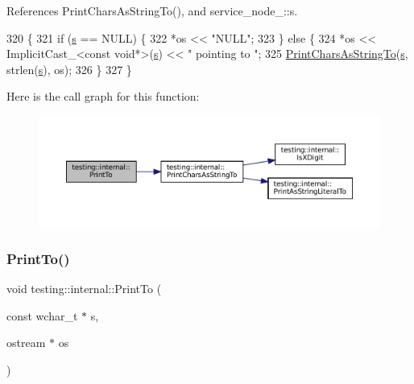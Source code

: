 References Print\+Chars\+As\+String\+To(), and service\+\_\+node\+\_\+::s.


\begin{DoxyCode}
320                                          \{
321   \textcolor{keywordflow}{if} (\hyperlink{namespaceservice__node__3_aa976421a49e0b54f23833423400849ae}{s} == NULL) \{
322     *os << \textcolor{stringliteral}{"NULL"};
323   \} \textcolor{keywordflow}{else} \{
324     *os << ImplicitCast\_<const void*>(\hyperlink{namespaceservice__node__3_aa976421a49e0b54f23833423400849ae}{s}) << \textcolor{stringliteral}{" pointing to "};
325     \hyperlink{namespacetesting_1_1internal_a0be71e6d7cb274131c559193f81c83e2}{PrintCharsAsStringTo}(\hyperlink{namespaceservice__node__3_aa976421a49e0b54f23833423400849ae}{s}, strlen(\hyperlink{namespaceservice__node__3_aa976421a49e0b54f23833423400849ae}{s}), os);
326   \}
327 \}
\end{DoxyCode}
Here is the call graph for this function\+:
\nopagebreak
\begin{figure}[H]
\begin{center}
\leavevmode
\includegraphics[width=350pt]{namespacetesting_1_1internal_adc6c98306d40b53fd07be4e295102a0a_cgraph}
\end{center}
\end{figure}
\mbox{\label{namespacetesting_1_1internal_afc20fb56b2547a8f91f9ff99650f2024}} 
\subsubsection{\texorpdfstring{Print\+To()}{PrintTo()}\hspace{0.1cm}{\footnotesize\ttfamily [3/20]}}
{\footnotesize\ttfamily void testing\+::internal\+::\+Print\+To (\begin{DoxyParamCaption}\item[{const wchar\+\_\+t $\ast$}]{s,  }\item[{ostream $\ast$}]{os }\end{DoxyParamCaption})}



